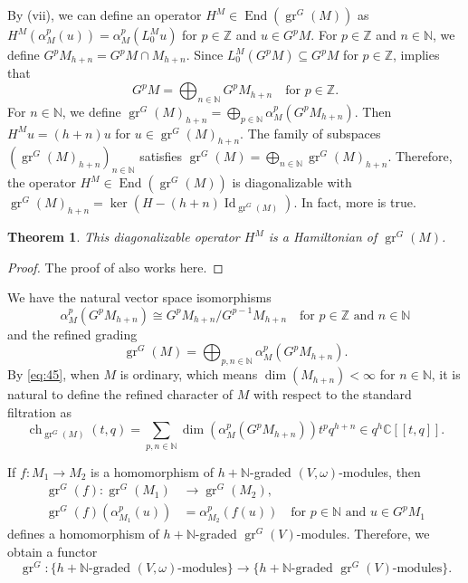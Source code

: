 \documentclass[a4paper, 12pt, reqno]{amsart}
\newtheorem{theorem}{Theorem}[section]
\theoremstyle{remark}
\DeclareMathOperator{\Id}{Id}
\DeclareMathOperator{\gr}{gr}
\DeclareMathOperator{\End}{End}
\DeclareMathOperator{\ch}{ch}
\begin{document}
By (vii), we can define an operator $H^M \in \End(\gr^G(M))$ as $H^M(\alpha_M^p(u)) = \alpha_M^p(L^M_0u)$ for $p \in \mathbb{Z}$ and $u \in G^pM$.
For $p \in \mathbb{Z}$ and $n \in \mathbb{N}$, we define $G^pM_{h + n} = G^pM \cap M_{h + n}$.
Since $L_0^M(G^pM) \subseteq G^pM$ for $p \in \mathbb{Z}$,  implies that
\begin{equation*}
  G^pM = \bigoplus_{n \in \mathbb{N}}G^pM_{h + n} \quad \text{for $p \in \mathbb{Z}$}.
\end{equation*}
For $n \in \mathbb{N}$, we define $\gr^G(M)_{h + n} = \bigoplus_{p \in \mathbb{N}}\alpha_M^p(G^pM_{h + n})$.
Then $H^Mu = (h + n)u$ for $u \in \gr^G(M)_{h + n}$.
The family of subspaces $(\gr^G(M)_{h + n})_{n \in \mathbb{N}}$ satisfies $\gr^G(M) = \bigoplus_{n \in \mathbb{N}}\gr^G(M)_{h + n}$.
Therefore, the operator $H^M \in \End(\gr^G(M))$ is diagonalizable with $\gr^G(M)_{h + n} = \ker(H - (h + n)\Id_{\gr^G(M)})$.
In fact, more is true.

\begin{theorem}
  \label{thr:55}
  This diagonalizable operator $H^M$ is a Hamiltonian of $\gr^G(M)$.
\end{theorem}

\begin{proof}
  The proof of  also works here.
\end{proof}

We have the natural vector space isomorphisms
\begin{equation*}
  \alpha_M^p(G^pM_{h + n}) \cong G^pM_{h + n}/G^{p - 1}M_{h + n} \quad \text{for $p \in \mathbb{Z}$ and $n \in \mathbb{N}$}
\end{equation*}
and the refined grading
\begin{equation}
  \label{eq:45}
  \gr^G(M) = \bigoplus_{p, n \in \mathbb{N}}\alpha_M^p(G^pM_{h + n}).
\end{equation}
By \eqref{eq:45}, when $M$ is ordinary, which means $\dim(M_{h + n}) < \infty$ for $n \in \mathbb{N}$, it is natural to define the refined character of $M$ with respect to the standard filtration as
\begin{equation*}
  \ch_{\gr^G(M)}(t, q) = \sum_{p, n \in \mathbb{N}}\dim(\alpha_M^p(G^pM_{h + n}))t^pq^{h + n} \in q^h\mathbb{C}[[t, q]].
\end{equation*}

If $f: M_1 \to M_2$ is a homomorphism of $h + \mathbb{N}$-graded $(V, \omega)$-modules, then
\begin{align*}
  \gr^G(f): \gr^G(M_1) &\to \gr^G(M_2), \\
  \gr^G(f)(\alpha^p_{M_1}(u)) &= \alpha^p_{M_2}(f(u)) \quad \text{for $p \in \mathbb{N}$ and $u \in G^pM_1$}
\end{align*}
defines a homomorphism of $h + \mathbb{N}$-graded $\gr^G(V)$-modules.
Therefore, we obtain a functor
\begin{equation*}
  \gr^G: \{\text{$h + \mathbb{N}$-graded $(V, \omega)$-modules}\} \to \{\text{$h + \mathbb{N}$-graded $\gr^G(V)$-modules}\}.
\end{equation*}
\end{document}
